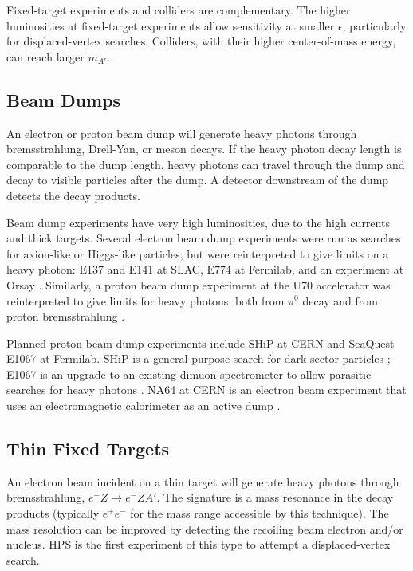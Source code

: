 Fixed-target experiments and colliders are complementary.
The higher luminosities at fixed-target experiments allow sensitivity at smaller $\epsilon$, particularly for displaced-vertex searches.
Colliders, with their higher center-of-mass energy, can reach larger $m_{A'}$.

\subsection{Beam Dumps}
An electron or proton beam dump will generate heavy photons through bremsstrahlung, Drell-Yan, or meson decays.
If the heavy photon decay length is comparable to the dump length, heavy photons can travel through the dump and decay to visible particles after the dump.
A detector downstream of the dump detects the decay products.


Beam dump experiments have very high luminosities, due to the high currents and thick targets.
Several electron beam dump experiments were run as searches for axion-like or Higgs-like particles, but were reinterpreted to give limits on a heavy photon: E137 \cite{bjorken_search_1988} and E141 \cite{riordan_search_1987} at SLAC, E774 \cite{bross_search_1991} at Fermilab, and an experiment at Orsay \cite{davier_unambiguous_1989}.
Similarly, a proton beam dump experiment at the U70 accelerator was reinterpreted to give limits for heavy photons, both from $\pi^0$ decay and from proton bremsstrahlung \cite{blumlein_new_2014}.

Planned proton beam dump experiments include SHiP at CERN and SeaQuest E1067 at Fermilab.
SHiP is a general-purpose search for dark sector particles \cite{ship_collaboration_facility_2015}; E1067 is an upgrade to an existing dimuon spectrometer to allow parasitic searches for heavy photons \cite{gardner_new_2016}.
NA64 at CERN is an electron beam experiment that uses an electromagnetic calorimeter as an active dump \cite{gninenko_search_2014}.

\subsection{Thin Fixed Targets}
An electron beam incident on a thin target will generate heavy photons through bremsstrahlung, $e^- Z \to e^- Z A'$.
The signature is a mass resonance in the decay products (typically $e^+e^-$ for the mass range accessible by this technique).
The mass resolution can be improved by detecting the recoiling beam electron and/or nucleus.
HPS is the first experiment of this type to attempt a displaced-vertex search.

